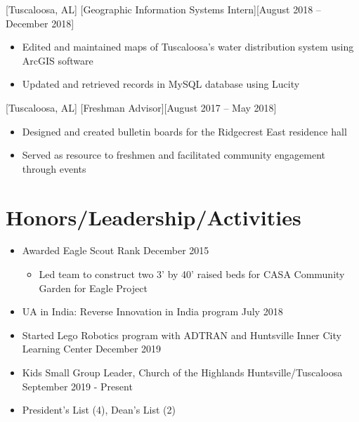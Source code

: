 \documentclass[hidelinks, 11pt]{article}
\begin{document}
[Tuscaloosa, AL]
[Geographic Information Systems Intern][August 2018 – December 2018]

\begin{itemize}
  \item Edited and maintained maps of Tuscaloosa’s water distribution system using ArcGIS software
  \item Updated and retrieved records in MySQL database using Lucity
\end{itemize}

[Tuscaloosa, AL]
[Freshman Advisor][August 2017 – May 2018]

\begin{itemize}
  \item Designed and created bulletin boards for the Ridgecrest East residence hall
  \item Served as resource to freshmen and facilitated community engagement through events
\end{itemize}

\section{Honors/Leadership/Activities}

\begin{itemize}
  \item Awarded Eagle Scout Rank \hfill December 2015
  \begin{itemize}
    \item Led team to construct two 3' by 40' raised beds for CASA Community Garden for Eagle Project
  \end{itemize}
  \item UA in India: Reverse Innovation in India program \hfill July 2018
  \item Started Lego Robotics program with ADTRAN and Huntsville Inner City Learning Center \hfill December 2019
  \item Kids Small Group Leader, Church of the Highlands Huntsville/Tuscaloosa \hfill September 2019 - Present
  \item President's List (4), Dean's List (2)
\end{itemize}
\end{document}
